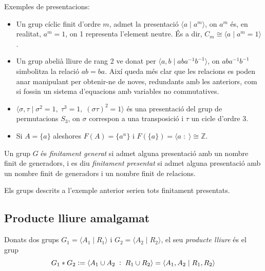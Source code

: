 \documentclass[../main.tex]{subfiles}
\begin{document}
\begin{ej}
\label{ej:exemplesdepresentacions} Exemples de presentacions:
\begin{itemize}
    \item Un grup cíclic finit d'ordre $m$, admet la presentació $\langle a\mid a^m\rangle$, on $a^m$ és, en realitat, $a^m=1$, on 1 representa l'element neutre. És a dir, $C_m\cong \langle a\mid a^m=1\rangle$.
    \item Un grup abelià lliure de rang 2 ve donat per $\langle a,b\mid aba^{-1}b^{-1}\rangle$, on $aba^{-1}b^{-1}$ simbolitza la relació $ab=ba$. Així queda més clar que les relacions es poden anar manipulant per obtenir-ne de noves, redundants amb les anteriors, com si fossin un sistema d'equacions amb variables no commutatives.
    \item $\langle \sigma,\tau\mid \sigma^2=1,\;\tau^3=1,\;(\sigma\tau)^2=1\rangle$ és una presentació del grup de permutacions $S_3$, on $\sigma$ correspon a una transposició i $\tau$ un cicle d'ordre 3.
    \item Si $A=\{a\}$ aleshores $F(A) = \{a^n\}$ i $F(\{a\}) = \langle a\;:\;\rangle\cong\mathbb{Z}$.
\end{itemize}
\end{ej}

\begin{defi}
\label{def:finitamentpresentat} Un grup $G$ és \textit{finitament generat} si admet alguna presentació amb un nombre finit de generadors, i es diu \textit{finitament presentat} si admet alguna presentació amb un nombre finit de generadors i un nombre finit de relacions.
\end{defi}

\begin{ej}
\label{ej:grupfinitamentpresentat} Els grups descrits a l'exemple anterior serien tots finitament presentats.
\end{ej}

\subsection{Producte lliure amalgamat}

\begin{defi}
\label{def:productelliure} Donats dos grups $G_1 = \langle A_1\mid R_1\rangle$ i $G_2=\langle A_2\mid R_2\rangle$, el seu \textit{producte lliure} és el grup 
\begin{equation}
    \notag
    G_1*G_2:=\langle A_1\cup A_2\;:\;R_1\cup R_2\rangle=\langle A_1,A_2\mid R_1,R_2\rangle
\end{equation}
\end{defi}
\end{document}
